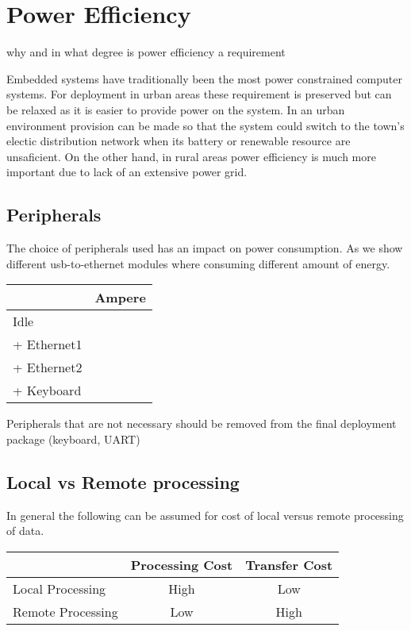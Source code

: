 \section{Power Efficiency}

why and in what degree is power efficiency a requirement

Embedded systems have traditionally been the most power constrained computer systems. For deployment in urban areas these requirement is preserved but can be relaxed as it is easier to provide power on the system. In an urban environment provision can be made so that the system could switch to the town's electic distribution network when its battery or renewable resource are unsaficient. On the other hand, in rural areas power efficiency is much more important due to lack of an extensive power grid.

\subsection{Peripherals}

The choice of peripherals used has an impact on power consumption. As we show different usb-to-ethernet modules where consuming different amount of energy.

\begin{center}
 \begin{tabular}{| l | c |}
 \hline
   & Ampere \\
 \hline
 \hline
 Idle &  \\
 \hline
 + Ethernet1 & \\
 \hline
 + Ethernet2 & \\
 \hline
 + Keyboard & \\
 \hline
 \end{tabular}
\end{center}

Peripherals that are not necessary should be removed from the final deployment package (keyboard, UART)


\subsection{Local vs Remote processing}

In general the following can be assumed for cost of local versus remote processing of data.

\begin{center}
 \begin{tabular}{| l | c | c |}
 \hline
   & Processing Cost & Transfer Cost \\
 \hline
 \hline
 Local Processing & High & Low \\
 \hline
 Remote Processing & Low & High \\
 \hline
 \end{tabular}
\end{center}


